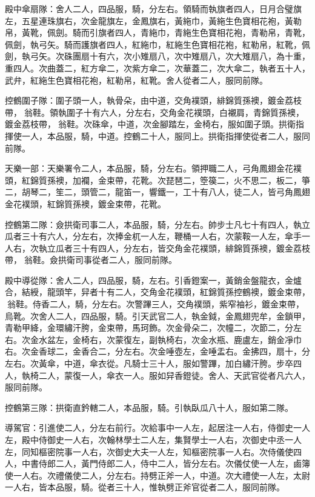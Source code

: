 \begin{pinyinscope}
 殿中傘扇隊：舍人二人，四品服，騎，分左右。領騎而執旗者四人，日月合璧旗左，五星連珠旗右，次金龍旗左，金鳳旗右，黃絁巾，黃絁生色寶相花袍，黃勒帛，黃靴，佩劍。騎而引旗者四人，青絁巾，青絁生色寶相花袍，青勒帛，青靴，佩劍，執弓矢。騎而護旗者四人，紅絁巾，紅絁生色寶相花袍，紅勒帛，紅靴，佩劍，執弓矢。次硃團扇十有六，次小雉扇八，次中雉扇八，次大雉扇八，為十重，重四人。次曲蓋二，紅方傘二，次紫方傘二，次華蓋二，次大傘二，執者五十人，武弁，紅絁生色寶相花袍，紅勒帛，紅靴。舍人從者二人，服同前隊。



 控鶴圍子隊：圍子頭一人，執骨朵，由中道，交角襆頭，緋錦質孫襖，鍍金荔枝帶，翁鞋。領執圍子十有六人，分左右，交角金花襆頭，白襯肩，青錦質孫襖，鍍金荔枝帶，翁鞋。次硃傘，中道，次金腳踏左，金椅右，服如圍子頭。拱衛指揮使一人，本品服，騎，中道。控鶴二十人，服同上。拱衛指揮使從者二人，服同前隊。



 天樂一部：天樂署令二人，本品服，騎，分左右。領押職二人，弓角鳳翅金花襆頭，紅錦質孫襖，加襴，金束帶，花靴。次琵琶二，箜篌二，火不思二，板二，箏二，胡琴二，笙二，頭管二，龍笛一，響鐵一，工十有八人，徒二人，皆弓角鳳翅金花襆頭，紅錦質孫襖，鍍金束帶，花靴。



 控鶴第二隊：僉拱衛司事二人，本品服，騎，分左右。帥步士凡七十有四人，執立瓜者三十有六人，分左右，次捧金杌一人左，鞭桶一人右，次蒙鞍一人左，傘手一人右，次執立瓜者三十有四人，分左右，皆交角金花襆頭，緋錦質孫襖，鍍金荔枝帶，翁鞋。僉拱衛司事從者二人，服同前隊。



 殿中導從隊：舍人二人，四品服，騎，左右。引香鐙案一，黃銷金盤龍衣，金爐合，結綬，龍頭竿，舁者十有二人，交角金花襆頭，紅錦質孫控鶴襖，鍍金束帶，翁鞋。侍香二人，騎，分左右。次警蹕三人，交角襆頭，紫窄袖衫，鍍金束帶，烏靴。次舍人二人，四品服，騎。引天武官二人，執金鉞，金鳳翅兜牟，金鎖甲，青勒甲絳，金環繡汗胯，金束帶，馬珂飾。次金骨朵二，次幢二，次節二，分左右。次金水盆左，金椅右，次蒙復左，副執椅右，次金水瓶、鹿盧左，銷金凈巾右。次金香球二，金香合二，分左右。次金唾壺左，金唾盂右。金拂四，扇十，分左右。次黃傘，中道，傘衣從。凡騎士三十人，服如警蹕，加白繡汗胯。步卒四人，執椅二人，蒙復一人，傘衣一人。服如舁香鐙徒。舍人、天武官從者凡六人，服同前隊。



 控鶴第三隊：拱衛直鈐轄二人，本品服，騎。引執臥瓜八十人，服如第二隊。



 導駕官：引進使二人，分左右前行。次給事中一人左，起居注一人右，侍御史一人左，殿中侍御史一人右，次翰林學士二人左，集賢學士一人右，次御史中丞一人左，同知樞密院事一人右，次御史大夫一人左，知樞密院事一人右。次侍儀使四人，中書侍郎二人，黃門侍郎二人，侍中二人，皆分左右。次儀仗使一人左，鹵簿使一人右。次禮儀使二人，分左右。持劈正斧一人，中道。次大禮使一人左，太尉一人右，皆本品服，騎。從者三十人，惟執劈正斧官從者二人，服同前隊。




\end{pinyinscope}
